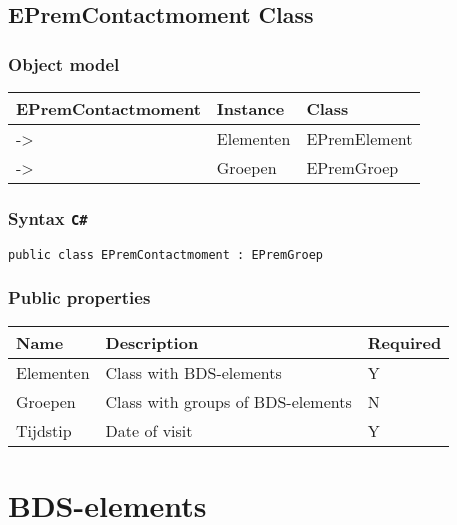 \documentclass[]{book}
\begin{document}
\hypertarget{epremcontactmoment-class}{%
\subsection{EPremContactmoment Class}\label{epremcontactmoment-class}}

\hypertarget{object-model-2}{%
\subsubsection{Object model}\label{object-model-2}}

\begin{longtable}[]{@{}lll@{}}
\toprule
EPremContactmoment & Instance & Class\tabularnewline
\midrule
\endhead
-\textgreater{} & Elementen & EPremElement\tabularnewline
-\textgreater{} & Groepen & EPremGroep\tabularnewline
\bottomrule
\end{longtable}

\hypertarget{syntax-c-3}{%
\subsubsection{\texorpdfstring{Syntax \texttt{C\#}}{Syntax C\#}}\label{syntax-c-3}}

\texttt{public\ class\ EPremContactmoment\ :\ EPremGroep}

\hypertarget{public-properties-3}{%
\subsubsection{Public properties}\label{public-properties-3}}

\begin{longtable}[]{@{}lll@{}}
\toprule
Name & Description & Required\tabularnewline
\midrule
\endhead
Elementen & Class with BDS-elements & Y\tabularnewline
Groepen & Class with groups of BDS-elements & N\tabularnewline
Tijdstip & Date of visit & Y\tabularnewline
\bottomrule
\end{longtable}

\hypertarget{bds-elements}{%
\section{BDS-elements}\label{bds-elements}}
\end{document}
